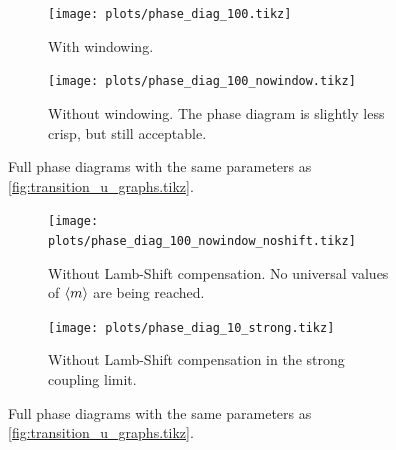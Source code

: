 \documentclass[10pt, aspectratio=169]{beamer}
\begin{document}
\begin{frame}
  \begin{figure}[H]
    \centering
    \begin{subfigure}[t]{.49\linewidth}
      \texttt{[image: plots/phase\_diag\_100.tikz]}
      \caption{With windowing.}
    \end{subfigure}
    \begin{subfigure}[t]{.49\linewidth}
      \texttt{[image: plots/phase\_diag\_100\_nowindow.tikz]}
      \caption{Without windowing. The phase diagram is slightly less
        crisp, but still acceptable.}
    \end{subfigure}
    \caption{\label{fig:fullphase}Full phase diagrams with the same
      parameters as \cref{fig:transition_u_graphs.tikz}.}
  \end{figure}
\end{frame}

\begin{frame}
  \begin{figure}[H]
    \centering
    \begin{subfigure}[t]{.49\linewidth}
      \texttt{[image: plots/phase\_diag\_100\_nowindow\_noshift.tikz]}
      \caption{Without Lamb-Shift compensation. No universal values of
        \(\ev{m}\) are being reached.}
    \end{subfigure}
    \begin{subfigure}[t]{.49\linewidth}
      \texttt{[image: plots/phase\_diag\_10\_strong.tikz]}
      \caption{Without Lamb-Shift compensation in the strong coupling limit.}
    \end{subfigure}
    \caption{\label{fig:fullphase}Full phase diagrams with the same
      parameters as \cref{fig:transition_u_graphs.tikz}.}
  \end{figure}
\end{frame}
\end{document}
